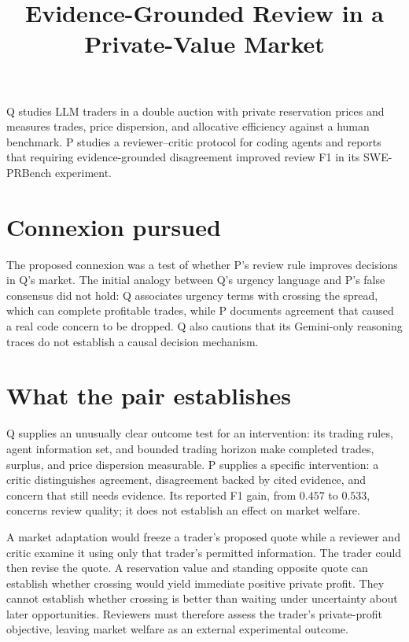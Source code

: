 \documentclass{article}
\title{Evidence-Grounded Review in a Private-Value Market}
\begin{document}
\maketitle

Q studies LLM traders in a double auction with private reservation prices and measures trades, price dispersion, and allocative efficiency against a human benchmark. P studies a reviewer--critic protocol for coding agents and reports that requiring evidence-grounded disagreement improved review F1 in its SWE-PRBench experiment.

\section*{Connexion pursued}

The proposed connexion was a test of whether P's review rule improves decisions in Q's market. The initial analogy between Q's urgency language and P's false consensus did not hold: Q associates urgency terms with crossing the spread, which can complete profitable trades, while P documents agreement that caused a real code concern to be dropped. Q also cautions that its Gemini-only reasoning traces do not establish a causal decision mechanism. 

\section*{What the pair establishes}

Q supplies an unusually clear outcome test for an intervention: its trading rules, agent information set, and bounded trading horizon make completed trades, surplus, and price dispersion measurable. P supplies a specific intervention: a critic distinguishes agreement, disagreement backed by cited evidence, and concern that still needs evidence. Its reported F1 gain, from \(0.457\) to \(0.533\), concerns review quality; it does not establish an effect on market welfare. 

A market adaptation would freeze a trader's proposed quote while a reviewer and critic examine it using only that trader's permitted information. The trader could then revise the quote. A reservation value and standing opposite quote can establish whether crossing would yield immediate positive private profit. They cannot establish whether crossing is better than waiting under uncertainty about later opportunities. Reviewers must therefore assess the trader's private-profit objective, leaving market welfare as an external experimental outcome. 
\end{document}
